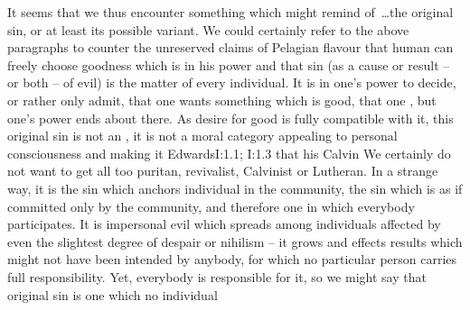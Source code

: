 \pa\label{pa:originalSin} It seems that we thus encounter something which might
remind of~\ldots the original sin, or at least its possible variant.  We could
certainly refer to the above paragraphs to counter the unreserved claims of
Pelagian flavour that human can freely choose goodness which is in his power and
that sin (as a cause or result -- or both -- of evil) is the matter of every
individual. It is in one's power to  decide, or rather only admit,
that one wants something which is good, that one , but
one's power ends about there.    As desire for good is fully compatible with it, this
original sin is not an , it is not a moral category appealing to
personal consciousness and making it  \citet{that the soul of man,
  as it is by nature, is in a corrupt, fallen and ruined state,}{Edwards}{I:1.1;
  I:1.3} that his \citet{whole nature is a seed of sin; hence it can be only
  hateful and abhorrent to God.}{Calvin}{} We
certainly do not want to get all too puritan, revivalist, Calvinist or Lutheran.
In a strange way, it is the sin which anchors individual in the community, the
sin which is as if committed only by the community, and therefore one in which
everybody participates. It is impersonal evil which spreads among individuals
affected by even the slightest degree of despair or nihilism -- it grows and
effects results which might not have been intended by anybody, for which no
particular person  carries full responsibility.  Yet, everybody is
responsible for it, so we might say that original sin is one which no individual
